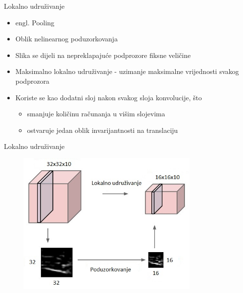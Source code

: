 \documentclass[pdf]{beamer}
\begin{document}
\begin{frame}{Lokalno udruživanje}

\begin{itemize}
\setlength\itemsep{0.5em}

	\item engl. Pooling
 
	\item  Oblik nelinearnog poduzorkovanja
	
	\item Slika se dijeli na nepreklapajuće podprozore fiksne veličine
	
	\item Maksimalno lokalno udruživanje -  uzimanje maksimalne vrijednosti svakog podprozora 
	
	\item Koriste se kao dodatni sloj nakon svakog sloja konvolucije, što
	
	\begin{itemize}
		\item smanjuje količinu računanja u višim slojevima
 		\item  ostvaruje jedan oblik invarijantnosti na translaciju 
 	\end{itemize}

	
\end{itemize} 

\end{frame}

\begin{frame}{Lokalno udruživanje}

\begin{figure}
\centering
\includegraphics[width=9cm]{slike/max_pooling.jpeg}
\end{figure}

\end{frame}
\end{document}
